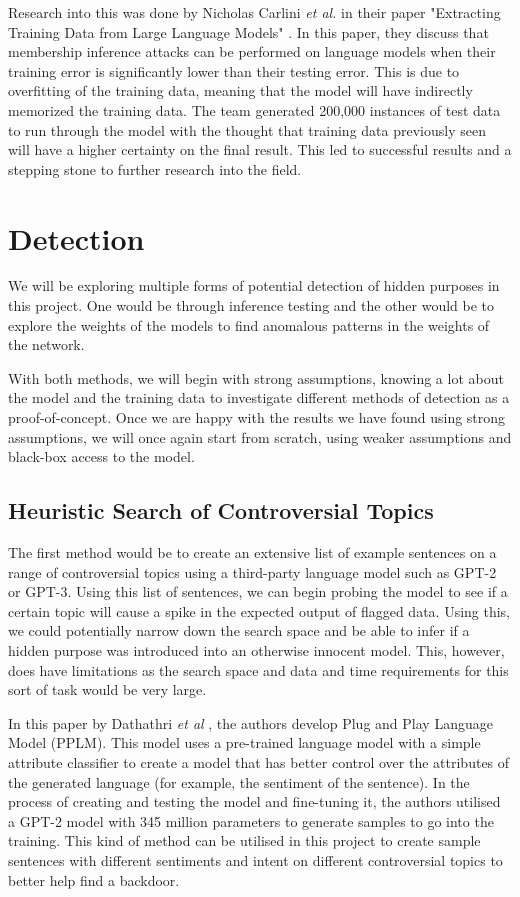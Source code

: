 Research into this was done by Nicholas Carlini \textit{et al.} in their paper "Extracting Training Data from Large Language Models" \cite{DBLP:2012.07805}. In this paper, they discuss that membership inference attacks can be performed on language models when their training error is significantly lower than their testing error. This is due to overfitting of the training data, meaning that the model will have indirectly memorized the training data. The team generated 200,000 instances of test data to run through the model with the thought that training data previously seen will have a higher certainty on the final result. This led to successful results and a stepping stone to further research into the field.

\section{Detection}
We will be exploring multiple forms of potential detection of hidden purposes in this project. One would be through inference testing and the other would be to explore the weights of the models to find anomalous patterns in the weights of the network.

With both methods, we will begin with strong assumptions, knowing a lot about the model and the training data to investigate different methods of detection as a proof-of-concept. Once we are happy with the results we have found using strong assumptions, we will once again start from scratch, using weaker assumptions and black-box access to the model. 

\subsection{Heuristic Search of Controversial Topics}

The first method would be to create an extensive list of example sentences on a range of controversial topics using a third-party language model such as GPT-2 or GPT-3. Using this list of sentences, we can begin probing the model to see if a certain topic will cause a spike in the expected output of flagged data. Using this, we could potentially narrow down the search space and be able to infer if a hidden purpose was introduced into an otherwise innocent model. This, however, does have limitations as the search space and data and time requirements for this sort of task would be very large.

In this paper by Dathathri \textit{et al} \cite{PlugNPlay}, the authors develop Plug and Play Language Model (PPLM). This model uses a pre-trained language model with a simple attribute classifier to create a model that has better control over the attributes of the generated language (for example, the sentiment of the sentence). In the process of creating and testing the model and fine-tuning it, the authors utilised a GPT-2 model with 345 million parameters \cite{GPT} to generate samples to go into the training. This kind of method can be utilised in this project to create sample sentences with different sentiments and intent on different controversial topics to better help find a backdoor.

